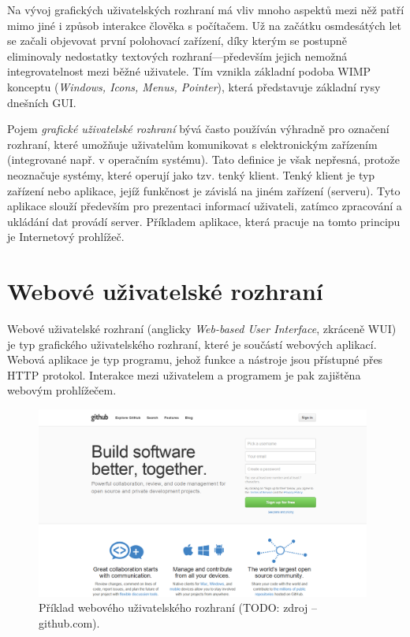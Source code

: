 Na vývoj grafických uživatelských rozhraní má vliv mnoho aspektů mezi něž patří mimo jiné i způsob interakce člověka s počítačem. Už na začátku osmdesátých let se začali objevovat první polohovací zařízení, díky kterým se postupně eliminovaly nedostatky textových rozhraní---především jejich nemožná integrovatelnost mezi běžné uživatele. Tím vznikla základní podoba WIMP konceptu (\textit{Windows, Icons, Menus, Pointer}), která představuje základní rysy dnešních GUI.

Pojem \textit{grafické uživatelské rozhraní} bývá často používán výhradně pro označení rozhraní, které umožňuje uživatelům komunikovat s elektronickým zařízením (integrované např. v operačním systému). Tato definice je však nepřesná, protože neoznačuje systémy, které operují jako tzv. tenký klient. Tenký klient je typ zařízení nebo aplikace, jejíž funkčnost je závislá na jiném zařízení (serveru). Tyto aplikace slouží především pro prezentaci informací uživateli, zatímco zpracování a ukládání dat provádí server. Příkladem aplikace, která pracuje na tomto principu je Internetový prohlížeč.

\section{Webové uživatelské rozhraní}
\label{sec:wui}

Webové uživatelské rozhraní (anglicky \textit{Web-based User Interface}, zkráceně WUI) je typ grafického uživatelského rozhraní, které je součástí webových aplikací. Webová aplikace je typ programu, jehož funkce a nástroje jsou přístupné přes HTTP protokol. Interakce mezi uživatelem a programem je pak zajištěna webovým prohlížečem.

\begin{figure}[htbp]
    \centering
    \includegraphics[width=11cm]{images/wui-example.png}
    \caption{Příklad webového uživatelského rozhraní (TODO: zdroj -- github.com).}
\end{figure}

